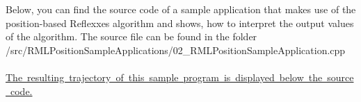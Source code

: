 Below, you can find the source code of a sample application that makes use of the position-\/based Reflexxes algorithm and shows, how to interpret the output values of the algorithm. The source file can be found in the folder~\newline
~\newline
{\ttfamily /src/\+R\+M\+L\+Position\+Sample\+Applications/02\+\_\+\+R\+M\+L\+Position\+Sample\+Application.cpp}~\newline
~\newline
\mbox{\hyperlink{page_Code_02_RMLPositionSampleApplication_anc_PositionExample2}{The resulting trajectory of this sample program is displayed below the source code.}} ~\newline
~\newline
 
\begin{DoxyCodeInclude}{0}
\end{DoxyCodeInclude}


~\newline
~\newline
\label{page_Code_02_RMLPositionSampleApplication_anc_PositionExample2}%
%
 

